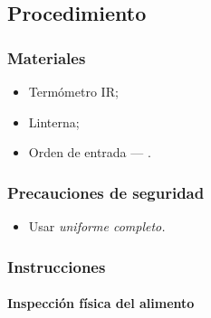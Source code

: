 \subsection{Procedimiento}

\subsubsection{Materiales}
\begin{itemize}
	\item Termómetro IR;
	\item Linterna;
	\item Orden de entrada --- \Oent.
\end{itemize}

\subsubsection{Precauciones de seguridad}

\begin{itemize}
	\item Usar \emph{uniforme completo.}
\end{itemize}

\subsubsection{Instrucciones}
\paragraph{Inspección física del alimento}

